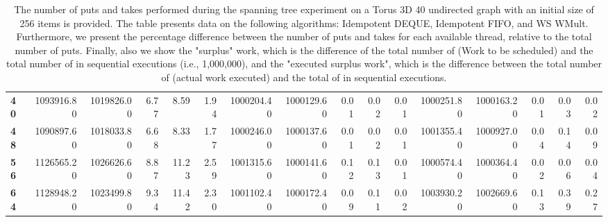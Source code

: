 \begin{table}[!ht]
{\begin{tabular}{lrrrrrrrrrrrrrrr}
\textbf{40} &       1093916.80 & 1019826.00 &           6.77 &        8.59 &                 1.94 &      1000204.40 & 1000129.60 &           0.01 &        0.02 &                 0.01 & 1000251.80 & 1000163.20 &           0.01 &        0.03 &                 0.02 \\
\textbf{48} &       1090897.60 & 1018033.80 &           6.68 &        8.33 &                 1.77 &      1000246.00 & 1000137.60 &           0.01 &        0.02 &                 0.01 & 1001355.40 & 1000927.00 &           0.04 &        0.14 &                 0.09 \\
\textbf{56} &       1126565.20 & 1026626.60 &           8.87 &       11.23 &                 2.59 &      1001315.60 & 1000141.60 &           0.12 &        0.13 &                 0.01 & 1000574.40 & 1000364.40 &           0.02 &        0.06 &                 0.04 \\
\textbf{64} &       1128948.20 & 1023499.80 &           9.34 &       11.42 &                 2.30 &      1001102.40 & 1000172.40 &           0.09 &        0.11 &                 0.02 & 1003930.20 & 1002669.60 &           0.13 &        0.39 &                 0.27 \\
\bottomrule
\end{tabular}}
\label{difference-Torus_3D_40_undirected-256-IDEMPOTENT_DEQUE-IDEMPOTENT_FIFO-WS_NC_MULT_OPT}
\caption{The number of puts and takes performed during the
    spanning tree experiment on a Torus 3D 40 undirected graph with an initial size
    of 256 items is provided. The table presents data on the
    following algorithms: Idempotent DEQUE, Idempotent FIFO, and
    WS WMult. Furthermore, we present the percentage difference
    between the number of puts and takes for each available thread,
    relative to the total number of puts. Finally, also we show the
    "surplus" work, which is the difference of the total number of
    \Puts (Work to be scheduled) and the total number of \Puts in
    sequential executions (i.e., 1,000,000), and the "executed surplus
    work", which is the difference between the total number of \Takes
    (actual work executed) and the total of \Takes in sequential
    executions.}
\end{table}
